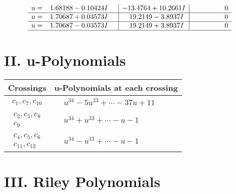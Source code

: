 \documentclass[1p]{elsarticle_modified}
\theoremstyle{definition}
\begin{document}
$$\begin{array}{c|c|c}
\begin{aligned}
u &= \phantom{-}1.68188 - 0.10424 I\end{aligned}
 & -13.4764 + 10.2661 I & \phantom{-0.000000 } 0 \\ \hline\begin{aligned}
u &= \phantom{-}1.70687 + 0.03573 I\end{aligned}
 & \phantom{-}19.2149 - 3.8937 I & \phantom{-0.000000 } 0 \\ \hline\begin{aligned}
u &= \phantom{-}1.70687 - 0.03573 I\end{aligned}
 & \phantom{-}19.2149 + 3.8937 I & \phantom{-0.000000 } 0\\
 \hline 
 \end{array}$$\newpage
\newpage\renewcommand{\arraystretch}{1}
\centering \section*{ II. u-Polynomials}
\begin{tabular}{m{50pt}|m{274pt}}
Crossings & \hspace{64pt}u-Polynomials at each crossing \\
\hline $$\begin{aligned}c_{1},c_{7},c_{10}\end{aligned}$$&$\begin{aligned}
&u^{34}-5 u^{33}+\cdots-37 u+11
\end{aligned}$\\
\hline $$\begin{aligned}c_{2},c_{3},c_{8}\\c_{9}\end{aligned}$$&$\begin{aligned}
&u^{34}+u^{33}+\cdots- u-1
\end{aligned}$\\
\hline $$\begin{aligned}c_{4},c_{5},c_{6}\\c_{11},c_{12}\end{aligned}$$&$\begin{aligned}
&u^{34}- u^{33}+\cdots- u-1
\end{aligned}$\\
\hline
\end{tabular}\newpage\renewcommand{\arraystretch}{1}
\centering \section*{ III. Riley Polynomials}
\end{document}
